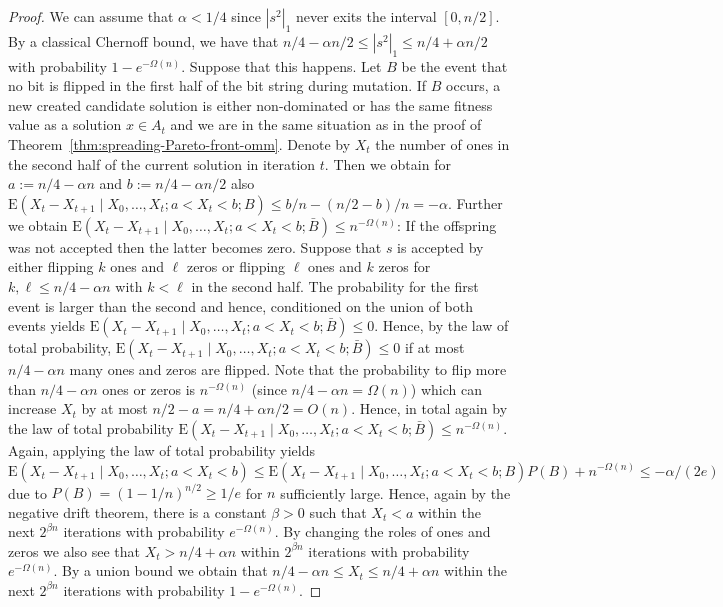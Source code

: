 \documentclass[
sigconf = false, %
review = false, %
screen = true, %
anonymous = true, %
format=acmsmall
]{acmart}
\newcommand{\ones}[1]{|#1|_1}
\renewcommand{\Pr}{P}
\newcommand*{\E}{\mathrm{E}}
\begin{document}
\begin{proof}
We can assume that $\alpha<1/4$ since $\ones{s^2}$ never exits the interval $[0,n/2]$. By a classical Chernoff bound, we have that $n/4-\alpha n/2 \leq \ones{s^2} \leq n/4+\alpha n/2$ with probability $1-e^{-\Omega(n)}$. Suppose that this happens. Let $B$ be the event that no bit is flipped in the first half of the bit string during mutation. If $B$ occurs, a new created candidate solution is either non-dominated or has the same fitness value as a solution $x \in A_t$ and we are in the same situation as in the proof of Theorem~\ref{thm:spreading-Pareto-front-omm}. Denote by $X_t$ the number of ones in the second half of the current solution in iteration $t$. Then we obtain for $a:=n/4-\alpha n$ and $b:=n/4-\alpha n/2$ also 
    $\E(X_t-X_{t+1} \mid X_0, \ldots , X_t; a < X_t < b;B) \leq b/n - (n/2-b)/n = -\alpha.$
    Further we obtain 
    $\E(X_t-X_{t+1} \mid X_0, \ldots , X_t; a < X_t < b;\bar{B}) \leq n^{-\Omega(n)}$: If the offspring was not accepted then the latter becomes zero. Suppose that $s$ is accepted by either flipping $k$ ones and $\ell$ zeros or flipping $\ell$ ones and $k$ zeros for $k,\ell \leq n/4-\alpha n$ with $k<\ell$ in the second half. The probability for the first event is larger than the second and hence, conditioned on the union of both events yields 
    $\E(X_t-X_{t+1} \mid X_0, \ldots , X_t; a < X_t < b;\bar{B}) \leq 0$.
    Hence, by the law of total probability, $\E(X_t-X_{t+1} \mid X_0, \ldots , X_t; a < X_t < b;\bar{B}) \leq 0$ if at most $n/4-\alpha n$ many ones and zeros are flipped. Note that the probability to flip more than $n/4-\alpha n$ ones or zeros is $n^{-\Omega(n)}$ (since $n/4-\alpha n = \Omega(n)$) which can increase $X_t$ by at most $n/2-a=n/4+\alpha n/2 = O(n)$. Hence, in total again by the law of total probability   
    $\E(X_t-X_{t+1} \mid X_0, \ldots , X_t; a < X_t < b;\bar{B}) \leq n^{-\Omega(n)}.$
    Again, applying the law of total probability yields
    $\E(X_t-X_{t+1} \mid X_0, \ldots , X_t; a < X_t < b)
    \leq \E(X_t-X_{t+1} \mid X_0, \ldots , X_t; a < X_t < b;B) \Pr(B) + n^{-\Omega(n)} \leq -\alpha/(2e)$
    due to $\Pr(B) = (1-1/n)^{n/2} \geq 1/e$ for $n$ sufficiently large. Hence, again by the negative drift theorem, there is a constant $\beta>0$ such that $X_t<a$ within the next $2^{\beta n}$ iterations with probability $e^{-\Omega(n)}$. By changing the roles of ones and zeros we also see that $X_t > n/4+\alpha n$ within $2^{\beta n}$ iterations with probability $e^{-\Omega(n)}$. By a union bound we obtain that $n/4 - \alpha n \leq X_t \leq n/4+\alpha n$ within the next $2^{\beta n}$ iterations with probability $1-e^{-\Omega(n)}$.
\end{proof}
\end{document}
